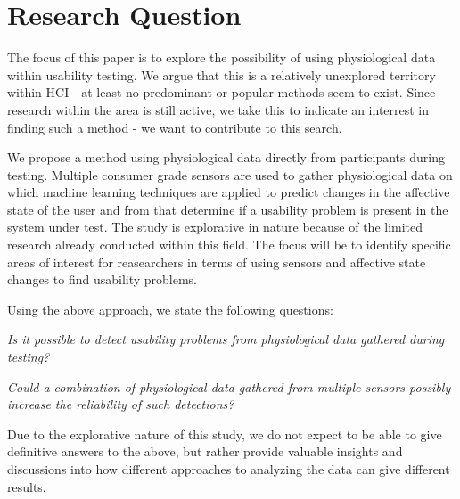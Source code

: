 \section{Research Question}
The focus of this paper is to explore the possibility of using physiological data within usability testing. We argue
that this is a relatively unexplored territory within HCI - at least no predominant or popular methods seem to
exist. Since research within the area is still active, we take this to indicate an interrest in finding such a method -
we want to contribute to this search.

We propose a method using physiological data directly from participants during testing.  Multiple consumer grade
sensors are used to gather physiological data on which machine learning techniques are applied to predict changes in the
affective state of the user and from that determine if a usability problem is present in the system under test. The study is
explorative in nature because of the limited research already conducted within this field.  The focus will be to
identify specific areas of interest for reasearchers in terms of using sensors and affective state changes to find
usability problems.

Using the above approach, we state the following questions:

\textit{Is it possible to detect usability problems from physiological data gathered during testing?}

\textit{Could a combination of physiological data gathered from multiple sensors possibly increase the reliability of such detections?}

Due to the explorative nature of this study, we do not expect to be able to give definitive answers to the above, but
rather provide valuable insights and discussions into how different approaches to analyzing the data can give different results.